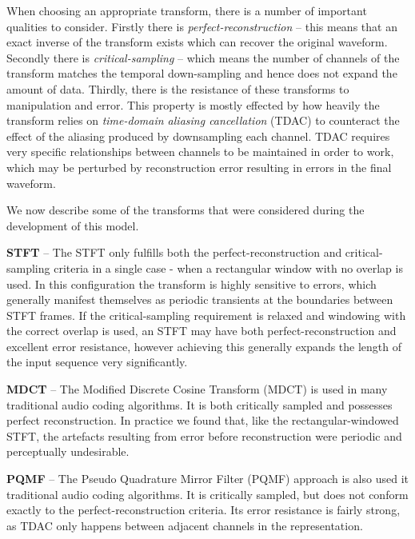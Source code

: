 \documentclass{article} %
\begin{document}
When choosing an appropriate transform, there is a number of important qualities to consider. Firstly there is \emph{perfect-reconstruction} \--- this means that an exact inverse of the transform exists which can recover the original waveform. Secondly there is \emph{critical-sampling} \--- which means the number of channels of the transform matches the temporal down-sampling and hence does not expand the amount of data. Thirdly, there is the resistance of these transforms to manipulation and error. This property is mostly effected by how heavily the transform relies on \emph{time-domain aliasing cancellation} (TDAC) to counteract the effect of the aliasing produced by downsampling each channel. TDAC requires very specific relationships between channels to be maintained in order to work, which may be perturbed by reconstruction error resulting in errors in the final waveform. 

We now describe some of the transforms that were considered during the development of this model.

\textbf{STFT} \---
The STFT only fulfills both the perfect-reconstruction and critical-sampling criteria in a single case \-- when a rectangular window with no overlap is used. In this configuration the transform is highly sensitive to errors, which generally manifest themselves as periodic transients at the boundaries between STFT frames. If the critical-sampling requirement is relaxed and windowing with the correct overlap is used, an STFT may have both perfect-reconstruction and excellent error resistance, however achieving this generally expands the length of the input sequence very significantly.

\textbf{MDCT} \---
The Modified Discrete Cosine Transform (MDCT) is used in many traditional audio coding algorithms. It is both critically sampled and possesses perfect reconstruction. In practice we found that, like the rectangular-windowed STFT, the artefacts resulting from error before reconstruction were periodic and perceptually undesirable.

\textbf{PQMF} \---
The Pseudo Quadrature Mirror Filter (PQMF) approach is also used it traditional audio coding algorithms. It is critically sampled, but does not conform exactly to the perfect-reconstruction criteria. Its error resistance is fairly strong, as TDAC only happens between adjacent channels in the representation.
\end{document}
